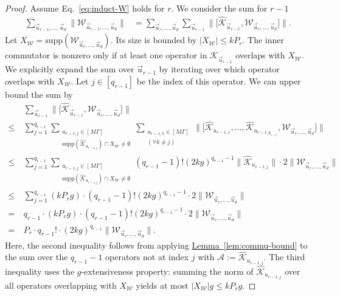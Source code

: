 \documentclass[aps,pra,reprint,groupedaddress,floatfix]{revtex4-2}
\newcommand{\lem}[1]{\hyperref[lem:#1]{Lemma~\ref*{lem:#1}}}
\newcommand{\supp}{\mathrm{supp}}
\newcommand{\mc}{\mathcal}
\begin{document}
\begin{proof}
    Assume Eq.~\eqref{eq:induct-W} holds for $r$. We consider the sum for $r-1$
    \begin{align*}
        \sum_{\vec{u}_{r-1}, \ldots, \vec{u}_d} \Big\|\mathcal{W}_{\vec{u}_{r-1}, \ldots, \vec{u}_d}\Big\| 
        &= \sum_{\vec{u}_{r}, \ldots, \vec{u}_d} \sum_{\vec{u}_{r-1}} \bigg\| \Big[ \hat{\mathcal{K}}_{\vec{u}_{r-1}}, \mathcal{W}_{\vec{u}_{r}, \ldots, \vec{u}_d} \Big] \bigg\|.
    \end{align*}
    Let $X_{\mathcal{W}} = \supp(\mathcal{W}_{\vec{u}_{r}, \ldots, \vec{u}_d})$. Its size is bounded by $|X_{\mathcal{W}}| \le k P_r$. The inner commutator is nonzero only if at least one operator in $\hat{\mathcal{K}}_{\vec{u}_{r-1}}$ overlaps with $X_{\mathcal{W}}$.
    We explicitly expand the sum over $\vec{u}_{r-1}$ by iterating over which operator overlaps with $X_{\mathcal{W}}$. Let $j \in [q_{r-1}]$ be the index of this operator. We can upper bound the sum by
    \begin{align*}
        & \sum_{\vec{u}_{r-1}} \bigg\| \Big[ \hat{\mathcal{K}}_{\vec{u}_{r-1}}, \mathcal{W}_{\vec{u}_{r}, \ldots, \vec{u}_d} \Big] \bigg\| \\
        \le~& \sum_{j=1}^{q_{r-1}} \sum_{\substack{u_{r-1, j} \in [M\Gamma] \\ \supp(\hat{\mathcal{K}}_{u_{r-1, j}}) \cap X_{\mathcal{W}} \neq \emptyset}} \sum_{\substack{u_{r-1, k} \in [M\Gamma] \\ (\forall k \neq j)}} \Big\| \big[ \hat{\mathcal{K}}_{u_{r-1,1}}, \ldots, \hat{\mathcal{K}}_{u_{r-1, q_{r-1}}}, \mathcal{W}_{\vec{u}_{r}, \ldots, \vec{u}_d} \big] \Big\| \\
        \le~& \sum_{j=1}^{q_{r-1}} \sum_{\substack{u_{r-1, j} \in [M\Gamma] \\ \supp(\hat{\mathcal{K}}_{u_{r-1, j}}) \cap X_{\mathcal{W}} \neq \emptyset}} (q_{r-1}-1)! (2kg)^{q_{r-1}-1} \|\hat{\mathcal{K}}_{u_{r-1, j}}\| \cdot 2 \Big\|\mathcal{W}_{\vec{u}_{r}, \ldots, \vec{u}_d}\Big\| \\
        \le~& \sum_{j=1}^{q_{r-1}} (k P_r g) \cdot (q_{r-1}-1)! (2kg)^{q_{r-1}-1} \cdot 2 \Big\|\mathcal{W}_{\vec{u}_{r}, \ldots, \vec{u}_d}\Big\| \\
        =~& q_{r-1} \cdot (k P_r g) \cdot (q_{r-1}-1)! (2kg)^{q_{r-1}-1} \cdot 2 \Big\|\mathcal{W}_{\vec{u}_{r}, \ldots, \vec{u}_d}\Big\| \\
        =~& P_r \cdot q_{r-1}! \cdot (2kg)^{q_{r-1}} \Big\|\mathcal{W}_{\vec{u}_{r}, \ldots, \vec{u}_d}\Big\|.
    \end{align*}
    Here, the second inequality follows from applying \lem{commu-bound} to the sum over the $q_{r-1}-1$ operators not at index $j$ with $\mc A:= \hat{\mathcal{K}}_{u_{r-1, j}}$.  The third inequality uses the $g$-extensiveness property: summing the norm of $\hat{\mathcal{K}}_{u_{r-1, j}}$ over all operators overlapping with $X_{\mathcal{W}}$ yields at most $|X_{\mathcal{W}}|g \le k P_r g$.
    

\end{proof}
\end{document}
